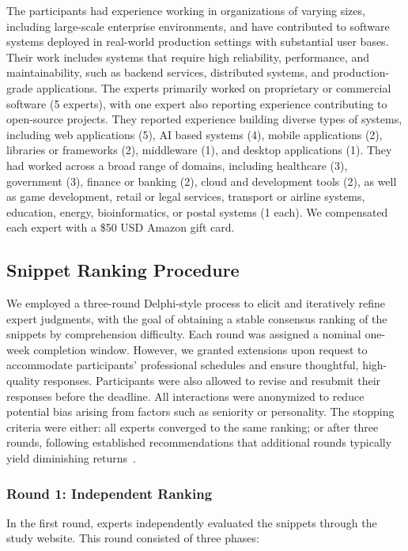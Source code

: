 The participants had experience working in organizations of varying sizes, including large-scale enterprise environments, and have contributed to software systems deployed in real-world production settings with substantial user bases. Their work includes systems that require high reliability, performance, and maintainability, such as backend services, distributed systems, and production-grade applications.
The experts primarily worked on proprietary or commercial software (5 experts), with one expert also reporting experience contributing to open-source projects.
They reported experience building diverse types of systems, including web applications (5), AI based systems (4), mobile applications (2), libraries or frameworks (2), middleware (1), and desktop applications (1).
They had worked across a broad range of domains, including healthcare (3), government (3), finance or banking (2), cloud and development tools (2), as well as game development, retail or legal services, transport or airline systems, education, energy, bioinformatics, or postal systems (1 each).
We compensated each expert with a \$50 USD Amazon gift card.

\subsection{Snippet Ranking Procedure}
\label{sec:expert-procedure}
We employed a three-round Delphi-style process to elicit and iteratively refine expert judgments, with the goal of obtaining a stable consensus ranking of the snippets by comprehension difficulty.
Each round was assigned a nominal one-week completion window. However, we granted extensions upon request to accommodate participants’ professional schedules and ensure thoughtful, high-quality responses. Participants were also allowed to revise and resubmit their responses before the deadline.
All interactions were anonymized to reduce potential bias arising from factors such as seniority or personality.
The stopping criteria were either: all experts converged to the same ranking; or after three rounds, following established recommendations that additional rounds typically yield diminishing returns~\cite{randManual}.

\subsubsection{Round 1: Independent Ranking}

In the first round, experts independently evaluated the snippets through the study website. This round consisted of three phases:

